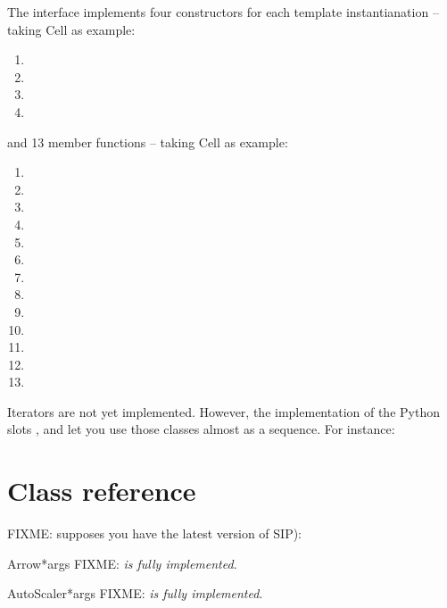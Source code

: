 \documentclass{manual}
\begin{document}
The interface implements four constructors for each template instantianation --
taking Cell as example:
\begin{enumerate}
\item
\item
\item
\item
\end{enumerate}

and 13 member functions -- taking Cell as example:
\begin{enumerate}
\item
\item
\item
\item
\item
\item
\item
\item
\item
\item
\item
\item
\item
\end{enumerate}

Iterators are not yet implemented. However, the implementation of the
Python slots ,  and
 let you use those classes almost as a sequence.
For instance:



\section{Class reference}

FIXME: supposes you have the latest version of SIP):

\begin{classdesc}{Arrow}{*args}
FIXME: \emph{is fully implemented}.
\end{classdesc}

\begin{classdesc}{AutoScaler}{*args}
FIXME: \emph{is fully implemented}.
\end{classdesc}
\end{document}
